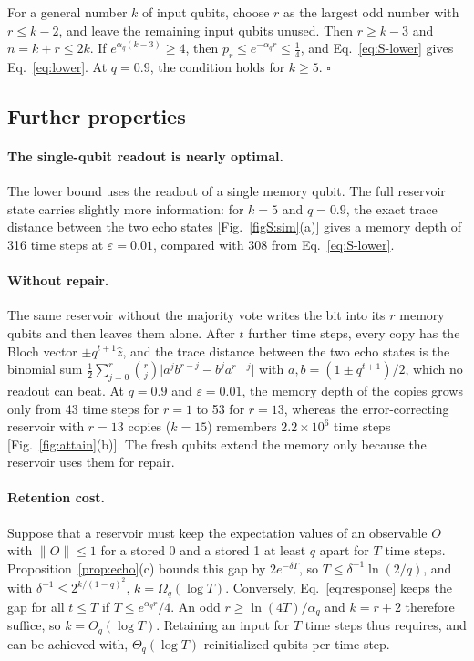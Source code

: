 \documentclass[aps,prl,twocolumn,superscriptaddress,floatfix]{revtex4-2}
\theoremstyle{plain}
\newcommand{\Norm}[1]{\lVert #1\rVert}
\begin{document}
For a general number $k$ of input qubits, choose $r$ as the largest odd number with $r\le k-2$, and leave the remaining input qubits unused. Then $r\ge k-3$ and $n=k+r\le2k$. If $e^{\alpha_q(k-3)}\ge4$, then $p_r\le e^{-\alpha_qr}\le\frac14$, and Eq.~\eqref{eq:S-lower} gives Eq.~\eqref{eq:lower}. At $q=0.9$, the condition holds for $k\ge5$. \hfill$\square$

\subsection{Further properties}

\paragraph*{The single-qubit readout is nearly optimal.} The lower bound uses the readout of a single memory qubit. The full reservoir state carries slightly more information: for $k=5$ and $q=0.9$, the exact trace distance between the two echo states [Fig.~\ref{figS:sim}(a)] gives a memory depth of 316 time steps at $\varepsilon=0.01$, compared with 308 from Eq.~\eqref{eq:S-lower}.

\paragraph*{Without repair.} The same reservoir without the majority vote writes the bit into its $r$ memory qubits and then leaves them alone. After $t$ further time steps, every copy has the Bloch vector $\pm q^{t+1}\hat z$, and the trace distance between the two echo states is the binomial sum $\frac12\sum_{j=0}^{r}\binom rj\bigl|a^jb^{r-j}-b^ja^{r-j}\bigr|$ with $a,b=(1\pm q^{t+1})/2$, which no readout can beat. At $q=0.9$ and $\varepsilon=0.01$, the memory depth of the copies grows only from 43 time steps for $r=1$ to 53 for $r=13$, whereas the error-correcting reservoir with $r=13$ copies ($k=15$) remembers $2.2\times10^6$ time steps [Fig.~\ref{fig:attain}(b)]. The fresh qubits extend the memory only because the reservoir uses them for repair.

\paragraph*{Retention cost.} Suppose that a reservoir must keep the expectation values of an observable $O$ with $\Norm O\le1$ for a stored 0 and a stored 1 at least $q$ apart for $T$ time steps. Proposition~\ref{prop:echo}(c) bounds this gap by $2e^{-\delta T}$, so $T\le\delta^{-1}\ln(2/q)$, and with $\delta^{-1}\le2^{k/(1-q)^2}$, $k=\Omega_q(\log T)$. Conversely, Eq.~\eqref{eq:response} keeps the gap for all $t\le T$ if $T\le e^{\alpha_qr}/4$. An odd $r\ge\ln(4T)/\alpha_q$ and $k=r+2$ therefore suffice, so $k=O_q(\log T)$. Retaining an input for $T$ time steps thus requires, and can be achieved with, $\Theta_q(\log T)$ reinitialized qubits per time step.
\end{document}
